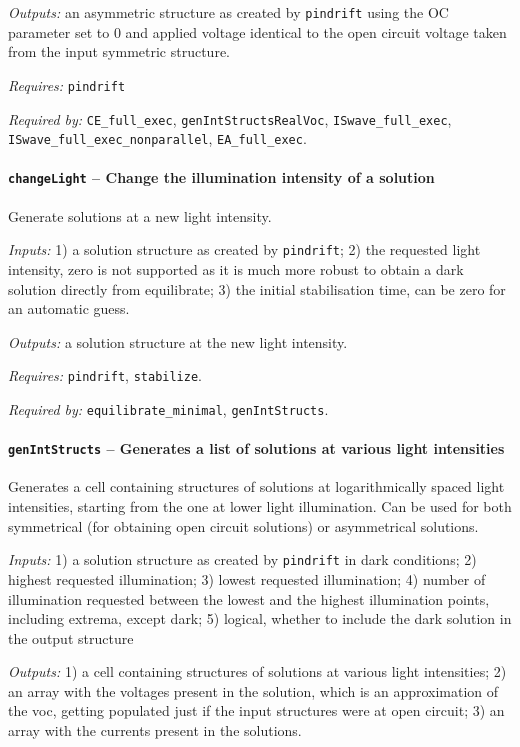 		\textit{Outputs:} an asymmetric structure as created by \texttt{pin\-drift} using the OC
		parameter set to 0 and applied voltage identical to the open circuit
		voltage taken from the input symmetric structure.

		\textit{Requires:} \texttt{pin\-drift}

		\textit{Required by:} \texttt{CE\_full\_exec}, \texttt{gen\-Int\-Structs\-Real\-Voc}, \texttt{IS\-wave\_full\_exec}, \texttt{IS\-wave\_full\_exec\_nonparallel}, \texttt{EA\_full\_exec}.

		\paragraph{\texttt{change\-Light} -- Change the illumination intensity of a solution}
		Generate solutions at a new light intensity.

		\textit{Inputs:} 1) a solution structure as created by \texttt{pin\-drift};
		2) the requested light intensity, zero is not supported as it is
		much more robust to obtain a dark solution directly from equilibrate;
		3) the initial stabilisation time, can be zero for an automatic
		guess.

		\textit{Outputs:} a solution structure at the new light intensity.

		\textit{Requires:} \texttt{pin\-drift}, \texttt{stabilize}.

		\textit{Required by:} \texttt{equilibrate\_minimal}, \texttt{gen\-Int\-Structs}.

		\paragraph{\texttt{gen\-Int\-Structs} -- Generates a list of solutions at various light intensities}\label{genIntStructs}
		Generates a cell containing structures of solutions at logarithmically spaced light intensities, starting from the one at lower light illumination. Can be used for both symmetrical (for obtaining open circuit solutions) or asymmetrical solutions.

		\textit{Inputs:} 1) a solution structure as created by \texttt{pin\-drift} in dark conditions;
		2) highest requested illumination;
		3) lowest requested illumination;
		4) number of illumination requested between the lowest and the highest illumination points, including extrema, except dark;
		5) logical, whether to include the dark solution in the output structure

		\textit{Outputs:} 1) a cell containing structures of solutions at various light
		intensities;
		2) an array with the voltages present in the solution, which is
		an approximation of the \gls{voc}, getting populated just if the input
		structures were at open circuit;
		3) an array with the currents present in the solutions.

